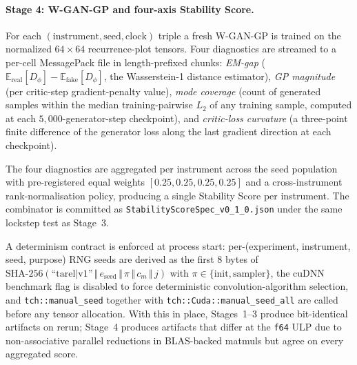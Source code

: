 \paragraph{Stage 4: W-GAN-GP and four-axis Stability Score.}
For each $(\text{instrument}, \text{seed}, \text{clock})$ triple a
fresh W-GAN-GP is trained on the normalized $64 \times 64$
recurrence-plot tensors. Four diagnostics are streamed to a per-cell
MessagePack file in length-prefixed chunks: \emph{EM-gap}
($\mathbb{E}_{\text{real}}[D_\phi] - \mathbb{E}_{\text{fake}}[D_\phi]$,
the Wasserstein-1 distance estimator), \emph{GP magnitude} (per
critic-step gradient-penalty value), \emph{mode coverage} (count of
generated samples within the median training-pairwise $L_2$ of any
training sample, computed at each $5{,}000$-generator-step
checkpoint), and \emph{critic-loss curvature} (a three-point finite
difference of the generator loss along the last gradient direction at
each checkpoint).

The four diagnostics are aggregated per instrument across the seed
population with pre-registered equal weights $[0.25, 0.25, 0.25,
0.25]$ and a cross-instrument rank-normalisation policy, producing a
single Stability Score per instrument. The combinator is committed as
\texttt{StabilityScoreSpec\_v0\_1\_0.json} under the same lockstep
test as Stage~3.

A determinism contract is enforced at process start: per-(experiment,
instrument, seed, purpose) RNG seeds are derived as the first 8 bytes
of $\mathrm{SHA\text{-}256}(\text{``tarel}|\text{v1''} \,\Vert\,
e_{\text{seed}} \,\Vert\, \pi \,\Vert\, c_m \,\Vert\, j)$ with
$\pi \in \{\text{init}, \text{sampler}\}$, the cuDNN benchmark flag is
disabled to force deterministic convolution-algorithm selection, and
\texttt{tch::manual\_seed} together with
\texttt{tch::Cuda::manual\_seed\_all} are called before any tensor
allocation. With this in place, Stages~1--3 produce bit-identical
artifacts on rerun; Stage~4 produces artifacts that differ at the
\texttt{f64} ULP due to non-associative parallel reductions in
BLAS-backed matmuls but agree on every aggregated score.

